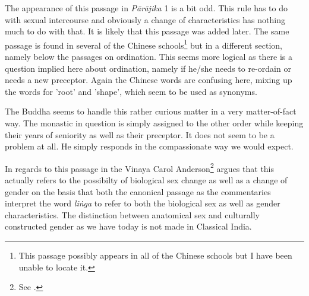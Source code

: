 The appearance of this passage in {\em Pārājika} 1 is a bit odd. This rule has to do with sexual intercourse and obviously a change of characteristics has nothing much to do with that. It is likely that this passage was added later. The same passage is found in several of the Chinese schools\footnote{This passage possibly appears in all of the Chinese schools but I have been unable to locate it.} but in a different section, namely below the passages on ordination. This seems more logical as there is a question implied here about ordination, namely if he/she needs to re-ordain or needs a new preceptor. Again the Chinese words are confusing here, mixing up the words for 'root' and 'shape', which seem to be used as synonyms.

The Buddha seems to handle this rather curious matter in a very matter-of-fact way. The monastic in question is simply assigned to the other order while keeping their years of seniority as well as their preceptor. It does not seem to be a problem at all. He simply responds in the compassionate way we would expect.

In regards to this passage in the Vinaya Carol Anderson\footnote{See \cite{anderson2016a}.} argues that this actually refers to the possibilty of biological sex change as well as a change of gender on the basis that both the canonical passage as the commentaries interpret the word {\em liṅga} to refer to both the biological sex as well as gender characteristics. The distinction between anatomical sex and culturally constructed gender as we have today is not made in Classical India.

